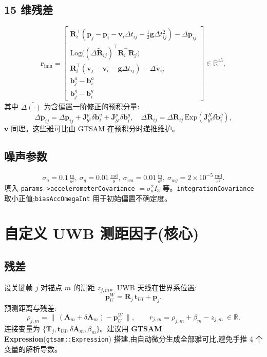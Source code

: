 \documentclass[11pt,a4paper]{report}
\newcommand{\R}{\mathbb{R}}
\newcommand{\bp}{\bm{p}}
\newcommand{\bv}{\bm{v}}
\newcommand{\bb}{\bm{b}}
\newcommand{\bg}{\bm{g}}
\newcommand{\bR}{\bm{R}}
\newcommand{\bT}{\bm{T}}
\newcommand{\bA}{\bm{A}}
\newcommand{\bt}{\bm{t}}
\begin{document}
\subsection{15 维残差}
\begin{equation}
\bm{r}_{\text{imu}}=
\begin{bmatrix}
\bR_i^\top(\bp_j-\bp_i-\bv_i\Delta t_{ij}-\tfrac12\bg\Delta t_{ij}^2)-\Delta\tilde{\bp}_{ij}\\[2pt]
\mathrm{Log}\!\big((\Delta\tilde{\bR}_{ij})^\top\bR_i^\top\bR_j\big)\\[2pt]
\bR_i^\top(\bv_j-\bv_i-\bg\Delta t_{ij})-\Delta\tilde{\bv}_{ij}\\[2pt]
\bb_j^a-\bb_i^a\\[2pt]
\bb_j^g-\bb_i^g
\end{bmatrix}\in\R^{15},
\end{equation}
其中 $\Delta\tilde{(\cdot)}$ 为含偏置一阶修正的预积分量:
\begin{equation}
\Delta\tilde{\bp}_{ij}=\Delta\bp_{ij}+\bm{J}^p_{b^a}\delta\bb^a_i+\bm{J}^p_{b^g}\delta\bb^g_i,\quad
\Delta\tilde{\bR}_{ij}=\Delta\bR_{ij}\,\mathrm{Exp}(\bm{J}^R_{b^g}\delta\bb^g_i),
\end{equation}
$\bm{v}$ 同理。这些雅可比由 GTSAM 在预积分时递推维护。

\subsection{噪声参数}
\begin{equation}
\sigma_a=0.1\,\tfrac{\text{m}}{\text{s}^2},\
\sigma_g=0.01\,\tfrac{\text{rad}}{\text{s}},\
\sigma_{wa}=0.01\,\tfrac{\text{m}}{\text{s}^3},\
\sigma_{wg}=2\!\times\!10^{-5}\,\tfrac{\text{rad}}{\text{s}^2}.
\end{equation}
填入 \texttt{params->accelerometerCovariance} $=\sigma_a^2 I_3$ 等。\texttt{integrationCovariance} 取小正值;\texttt{biasAccOmegaInt} 用于初始偏置不确定度。

\section{自定义 UWB 测距因子(核心)}
\subsection{残差}
设关键帧 $j$ 对锚点 $m$ 的测距 $z_{j,m}$。UWB 天线在世界系位置:
\begin{equation}
\bp_U^W = \bR_{j}\,\bt_{UI} + \bp_{j}.
\end{equation}
预测距离与残差:
\begin{equation}
\boxed{\ 
\rho_{j,m} = \big\|\,(\bA_m+\delta\bA_m)-\bp_U^W\,\big\|,\qquad
r_{j,m} = \rho_{j,m} + \beta_m - z_{j,m}\ \in\R.
\ }
\end{equation}
连接变量为 $\{\bT_j,\bt_{UI},\delta\bA_m,\beta_m\}$。建议用 \textbf{GTSAM Expression}(\texttt{gtsam::Expression}) 搭建,由自动微分生成全部雅可比,避免手推 4 个变量的解析导数。
\end{document}
